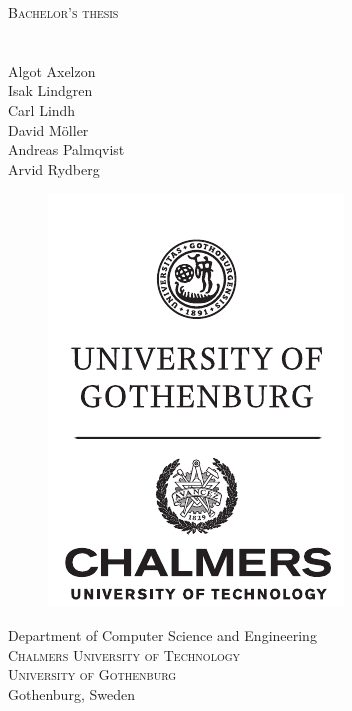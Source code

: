 \newpage
\thispagestyle{empty}
\begin{center}
	\textsc{\large Bachelor's thesis \the\year}\\[4cm]		%
	\textbf{\Large \multiLineTitle{0.2cm}} \\[1cm]

	{\large \oneLineSubtitle}\\[1cm]%
	{\large Algot Axelzon}\\[1ex]
	{\large Isak Lindgren}\\[1ex]
    {\large Carl Lindh}\\[1ex]
	{\large David Möller}\\[1ex]
	{\large Andreas Palmqvist}\\[1ex]
	{\large Arvid Rydberg}
	
	\vfill	
	\begin{figure}[H]
	\centering
	\includegraphics[width=0.25\pdfpagewidth]{figures/auxiliary/ChGULogoHog.pdf}
	\end{figure}	\vspace{5mm}	
	
	Department of Computer Science and Engineering\\
	\textsc{Chalmers University of Technology} \\
	\textsc{University of Gothenburg} \\
	Gothenburg, Sweden \the\year \\
\end{center}



